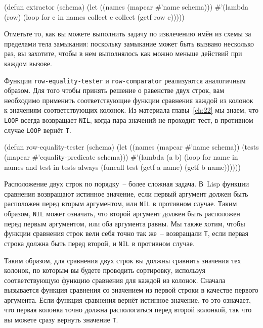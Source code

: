 \begin{myverb}
(defun extractor (schema)
  (let ((names (mapcar #'name schema)))
    #'(lambda (row)
        (loop for c in names collect c collect (getf row c)))))
\end{myverb}

Отметьте то, как вы можете выполнить задачу по извлечению имён из схемы за пределами тела
замыкания: поскольку замыкание может быть вызвано несколько раз, вы захотите, чтобы в нем
выполнялось как можно меньше действий при каждом вызове.

Функции \lstinline{row-equality-tester} и \lstinline{row-comparator} реализуются аналогичным
образом.  Для того чтобы принять решение о равенстве двух строк, вам необходимо применить
соответствующие функции сравнения каждой из колонок к значениям соответствующих колонок.
Из материала главы~\ref{ch:22} мы знаем, что \lstinline{LOOP} всегда возвращает \lstinline{NIL},
когда пара значений не проходит тест, в противном случае \lstinline{LOOP} вернёт \lstinline{T}.

\begin{myverb}
(defun row-equality-tester (schema)
  (let ((names (mapcar #'name schema))
        (tests (mapcar #'equality-predicate schema)))
    #'(lambda (a b)
        (loop for name in names and test in tests
           always (funcall test (getf a name) (getf b name))))))
\end{myverb}

Расположение двух строк по порядку~-- более сложная задача.  В~Lisp функции сравнения
возвращают истинное значение, если первый аргумент должен быть расположен перед вторым
аргументом, или \lstinline{NIL} в противном случае.  Таким образом, \lstinline{NIL} может означать,
что второй аргумент должен быть расположен перед первым аргументом, или оба аргумента
равны. Мы также хотим, чтобы функции сравнения строк вели себя точно так же~-- возвращали
\lstinline{T}, если первая строка должна быть перед второй, и \lstinline{NIL} в противном случае.

Таким образом, для сравнения двух строк вы должны сравнить значения тех колонок, по
которым вы будете проводить сортировку, используя соответствующую функцию сравнения для
каждой из колонок.  Сначала вызывается функция сравнения со значением из первой строки в
качестве первого аргумента.  Если функция сравнения вернёт истинное значение, то это
означает, что первая колонка точно должна распологаться перед второй колонкой, так что вы
можете сразу вернуть значение \lstinline{T}.

